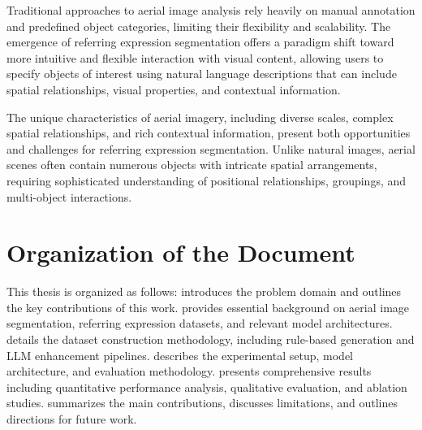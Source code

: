 Traditional approaches to aerial image analysis rely heavily on manual annotation and predefined object categories, limiting their flexibility and scalability. The emergence of referring expression segmentation offers a paradigm shift toward more intuitive and flexible interaction with visual content, allowing users to specify objects of interest using natural language descriptions that can include spatial relationships, visual properties, and contextual information.

The unique characteristics of aerial imagery, including diverse scales, complex spatial relationships, and rich contextual information, present both opportunities and challenges for referring expression segmentation. Unlike natural images, aerial scenes often contain numerous objects with intricate spatial arrangements, requiring sophisticated understanding of positional relationships, groupings, and multi-object interactions.
\section{Organization of the Document}
This thesis is organized as follows:  introduces the problem domain and outlines the key contributions of this work. 
 provides essential background on aerial image segmentation, referring expression datasets, and relevant model architectures.
 details the dataset construction methodology, including rule-based generation and LLM enhancement pipelines.
 describes the experimental setup, model architecture, and evaluation methodology.
 presents comprehensive results including quantitative performance analysis, qualitative evaluation, and ablation studies.
 summarizes the main contributions, discusses limitations, and outlines directions for future work.
